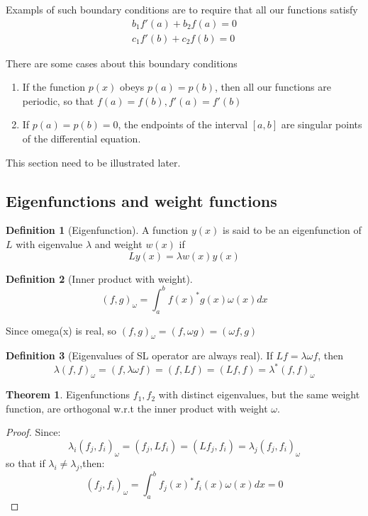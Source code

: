 \documentclass{article}
\theoremstyle{definition}
\newtheorem{definition}{Definition}[section]
\newtheorem{theorem}{Theorem}[section]
\begin{document}
Exampls of such boundary conditions are to require that all our functions satisfy
\begin{align}
b_1f'(a)+b_2f(a)=0\\
c_1f'(b)+c_2f(b)=0
\end{align}


There are some cases about this boundary conditions
\begin{enumerate}
	\item If the function $p(x)$ obeys $p(a)=p(b)$, then all our functions are periodic, so that $f(a)=f(b), f'(a)=f'(b)$
	\item If $p(a)=p(b)=0$, the endpoints of the interval $[a,b]$ are singular points of the differential equation.
\end{enumerate}

This section need to be illustrated later.


\subsection{Eigenfunctions and weight functions}



\begin{definition}[Eigenfunction]
A function $y(x)$ is said to be an eigenfunction of $L$ with eigenvalue $\lambda$ and weight $w(x)$ if
\begin{equation}
Ly(x)=\lambda w(x)y(x)
\end{equation}
\end{definition}


\begin{definition}[Inner product with weight]
\begin{equation}
(f,g)_{\omega}=\int_a^b f(x)^*g(x)\omega(x)dx
\end{equation}
\end{definition}

Since omega(x) is real, so $(f,g)_\omega=(f,\omega g)=(\omega f,g)$


\begin{definition}[Eigenvalues of SL operator are always real]
If $Lf=\lambda \omega f$, then 
\begin{equation}
\lambda (f,f)_\omega =(f,\lambda \omega f)=(f,Lf)=(Lf,f)=\lambda^*(f,f)_\omega 
\end{equation}
\end{definition}

\begin{theorem}
Eigenfunctions $f_1,f_2$ with distinct eigenvalues, but the same weight function, are orthogonal w.r.t the inner product with weight $\omega$.
\end{theorem}
\begin{proof}
Since:
\begin{equation}
\lambda_i(f_j,f_i)_\omega=(f_j,Lf_i)=(Lf_j,f_i)=\lambda_j(f_j,f_i)_\omega
\end{equation}
so that if $\lambda_i \neq \lambda_j$,then:
\begin{equation}
(f_j,f_i)_\omega=\int_a^b f_j(x)^*f_i(x)\omega(x)dx=0
\end{equation}
\end{proof}
\end{document}
